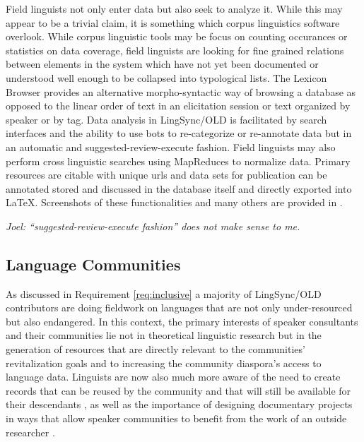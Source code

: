 \documentclass[11pt]{article}
\begin{document}
Field linguists not only enter data but also seek to analyze it. While this may appear to be a trivial claim, it is something which corpus linguistics software overlook. While corpus linguistic tools may be focus on counting occurances or statistics on data coverage, field linguists are looking for fine grained relations between elements in the system which have not yet been documented or understood well enough to be collapsed into typological lists. The Lexicon Browser provides an alternative morpho-syntactic way of browsing a database as opposed to the linear order of text in an elicitation session or text organized by speaker or by tag. Data analysis in LingSync/OLD is facilitated by search  interfaces and the ability to use bots to re-categorize or re-annotate data but in an automatic and suggested-review-execute fashion. Field linguists may also perform cross linguistic searches using MapReduces to normalize data. Primary resources are citable with unique urls and data sets for publication can be annotated stored and discussed in the database itself and directly exported into LaTeX.  Screenshots of these functionalities and many others are provided in \cite{lingsync:2012}.

\textit{Joel: ``suggested-review-execute fashion'' does not make sense to me.}

%
\subsection{Language Communities}

As discussed in Requirement \autoref{req:inclusive} a majority of LingSync/OLD contributors are doing fieldwork on languages that
are not only under-resourced but also endangered. In this context, the primary
interests of speaker consultants and their communities lie not in theoretical
linguistic research but in the generation of resources that are directly
relevant to the communities' revitalization goals and to increasing the community diaspora's
access to language data. Linguists are now also much more aware of the need to
create records that can be reused by the community and that will still be
available for their descendants \cite[p.129]{Thieberger:2012}, as well as the
importance of designing documentary projects in ways that allow speaker
communities to benefit from the work of an outside researcher \cite{Good:2012}.
\end{document}
